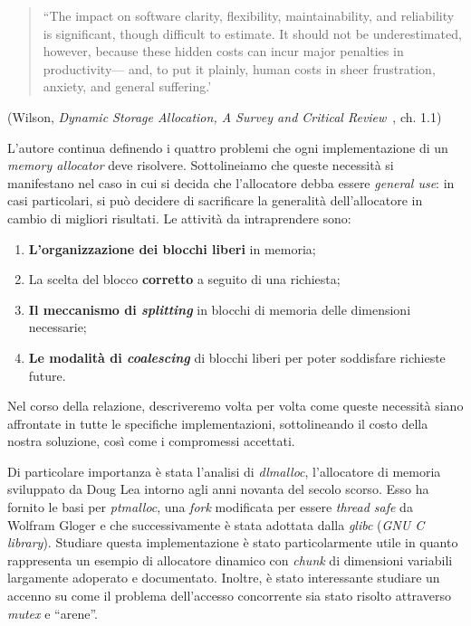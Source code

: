 \begin{quote}
``The impact on software clarity, flexibility, maintainability, and reliability is significant, though difficult to estimate. It should not be underestimated, however, because these hidden costs can incur major penalties in productivity--- and, to put it plainly, human costs in sheer frustration, anxiety, and general suffering.'
\end{quote}
\begin{flushright}
(Wilson, \textit{Dynamic Storage Allocation, A Survey and Critical Review}~\cite{wilson1995}, ch. 1.1)
\end{flushright}

L’autore continua definendo i quattro problemi che ogni implementazione di un \textit{memory allocator} deve risolvere. Sottolineiamo che queste necessità si manifestano nel caso in cui si decida che l’allocatore debba essere \textit{general use}: in casi particolari, si può decidere di sacrificare la generalità dell’allocatore in cambio di migliori risultati\footnotemark. Le attività da intraprendere sono:
\begin{enumerate}
  \item \textbf{L’organizzazione dei blocchi liberi} in memoria;
  \item La scelta del blocco \textbf{corretto} a seguito di una richiesta;
  \item \textbf{Il meccanismo di \textit{splitting}} in blocchi di memoria delle dimensioni necessarie;
  \item \textbf{Le modalità di \textit{coalescing}} di blocchi liberi per poter soddisfare richieste future.
\end{enumerate}
Nel corso della relazione, descriveremo volta per volta come queste necessità siano affrontate in tutte le specifiche implementazioni, sottolineando il costo della nostra soluzione, così come i compromessi accettati.


Di particolare importanza è stata l’analisi di \textit{dlmalloc}\cite{dlmalloc}, l’allocatore di memoria sviluppato da Doug Lea intorno agli anni novanta del secolo scorso. Esso ha fornito le basi per \textit{ptmalloc}, una \textit{fork} modificata per essere \textit{thread safe} da Wolfram Gloger e che successivamente è stata adottata dalla \textit{glibc} (\textit{GNU C library}). Studiare questa implementazione è stato particolarmente utile in quanto rappresenta un esempio di allocatore dinamico con \textit{chunk} di dimensioni variabili largamente adoperato e documentato. Inoltre, è stato interessante studiare un accenno su come il problema dell’accesso concorrente sia stato risolto attraverso \textit{mutex} e ``arene''.

